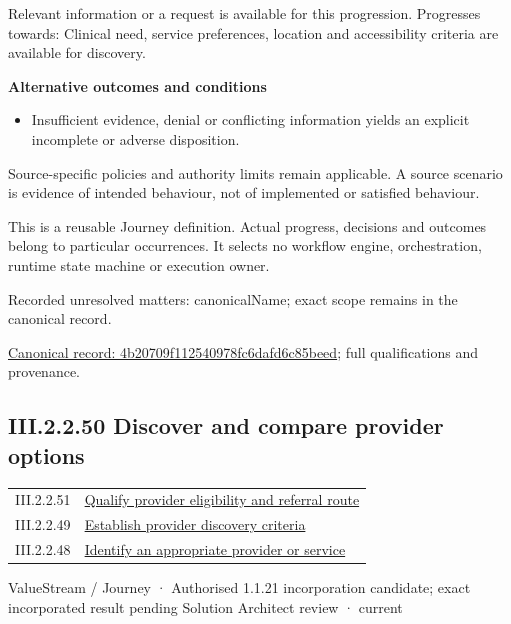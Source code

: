 Relevant information or a request is available for this progression. Progresses towards: Clinical need, service preferences, location and accessibility criteria are available for discovery.



\par\medskip\textbf{Alternative outcomes and conditions}\par


\begin{itemize}


\item Insufficient evidence, denial or conflicting information yields an explicit incomplete or adverse disposition.

\end{itemize}


Source-specific policies and authority limits remain applicable. A source scenario is evidence of intended behaviour, not of implemented or satisfied behaviour.



This is a reusable Journey definition. Actual progress, decisions and outcomes belong to particular occurrences. It selects no workflow engine, orchestration, runtime state machine or execution owner.


{\small Recorded unresolved matters: canonicalName; exact scope remains in the canonical record.}\par
{\footnotesize \href{../../../../../../../continuum/strategy/value-stream/4b20709f112540978fc6dafd6c85beed.md}{Canonical record: 4b20709f112540978fc6dafd6c85beed}; full qualifications and provenance.}\par
\subsection*{III.2.2.50 Discover and compare provider options}
\label{navigation:III.2.2.50}

\begin{longtable}{p{.22\linewidth}p{.73\linewidth}}
III.2.2.51 & \hyperref[element:1406d16dbefa4752af95ca6041cd5712]{Qualify provider eligibility and referral route} \\
III.2.2.49 & \hyperref[element:4b20709f112540978fc6dafd6c85beed]{Establish provider discovery criteria} \\
III.2.2.48 & \hyperref[element:5d725d797f754857bf1b3d49d8f25044]{Identify an appropriate provider or service} \\
\end{longtable}
\label{element:13370b1e9a1349d8ba074e3ad5a8c1ae}
{\small ValueStream / Journey · Authorised 1.1.21 incorporation candidate; exact incorporated result pending Solution Architect review · current}\par

